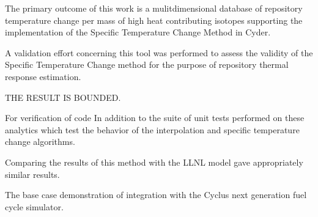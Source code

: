 
The primary outcome of this work is a mulitdimensional database of repository temperature 
change per mass of high heat contributing isotopes supporting the implementation 
of the Specific Temperature Change Method in Cyder. 

A validation effort concerning this tool was performed to assess the validity of 
the Specific Temperature Change method for the purpose of repository thermal 
response estimation. 



THE RESULT IS BOUNDED.

For verification of code In addition to the suite of unit tests performed on these analytics which test 
the behavior of the interpolation and specific temperature change algorithms.


Comparing the results of this method with the \gls{LLNL} model gave 
appropriately similar results. 


The base case demonstration of integration with the Cyclus next generation 
fuel cycle simulator.
